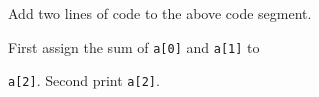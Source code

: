 Add two lines of code to the above code segment.

First assign the sum of \texttt{a[0]} and \texttt{a[1]} to

\texttt{a[2]}. Second print \texttt{a[2]}.

